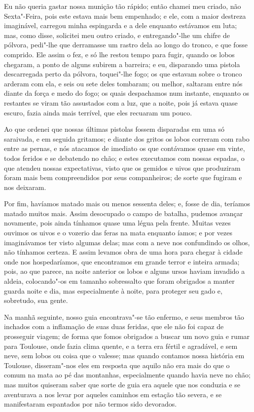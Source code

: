 Eu não queria gastar nossa munição tão rápido; então chamei meu criado,
não Sexta"-Feira, pois este estava mais bem empenhado; e ele, com a maior
destreza imaginável, carregou minha espingarda e a dele enquanto
estávamos em luta; mas, como disse, solicitei meu outro criado, e
entregando"-lhe um chifre de pólvora, pedi"-lhe que derramasse um rastro
dela ao longo do tronco, e que fosse comprido. Ele assim o fez, e só lhe
restou tempo para fugir, quando os lobos chegaram, a ponto de alguns
subirem a barreira; e eu, disparando uma pistola descarregada perto da
pólvora, toquei"-lhe fogo; os que estavam sobre o tronco arderam com ela,
e seis ou sete deles tombaram; ou melhor, saltaram entre nós diante da
força e medo do fogo; os quais despachamos num instante, enquanto os
restantes se viram tão assustados com a luz, que a noite, pois já estava
quase escuro, fazia ainda mais terrível, que eles recuaram um pouco.

Ao que ordenei que nossas últimas pistolas fossem disparadas em uma só
saraivada, e em seguida gritamos; e diante dos gritos os lobos correram
com rabo entre as pernas, e nós atacamos de imediato os que contávamos
quase em vinte, todos feridos e se debatendo no chão; e estes executamos
com nossas espadas, o que atendeu nossas expectativas, visto que os
gemidos e uivos que produziram foram mais bem compreendidos por seus
companheiros; de sorte que fugiram e nos deixaram.

Por fim, havíamos matado mais ou menos sessenta deles; e, fosse de dia,
teríamos matado muitos mais. Assim desocupado o campo de batalha,
pudemos avançar novamente, pois ainda tínhamos quase uma légua pela
frente. Muitas vezes ouvimos os uivos e o vozerio das feras na mata
enquanto íamos; e por vezes imaginávamos ter visto algumas delas; mas
com a neve nos confundindo os olhos, não tínhamos certeza. E assim
levamos obra de uma hora para chegar à cidade onde nos hospedaríamos,
que encontramos em grande terror e inteira armada; pois, ao que parece,
na noite anterior os lobos e alguns ursos haviam invadido a aldeia,
colocando"-os em tamanho sobressalto que foram obrigados a manter guarda
noite e dia, mas especialmente à noite, para proteger seu gado e,
sobretudo, sua gente.

Na manhã seguinte, nosso guia encontrava"-se tão enfermo, e seus membros
tão inchados com a inflamação de suas duas feridas, que ele não foi
capaz de prosseguir viagem; de forma que fomos obrigados a buscar um
novo guia e rumar para Toulouse, onde fazia clima quente, e a terra era
fértil e agradável, e sem neve, sem lobos ou coisa que o valesse; mas
quando contamos nossa história em Toulouse, disseram"-nos eles em
resposta que aquilo não era mais do que o comum na mata ao pé das
montanhas, especialmente quando havia neve no chão; mas muitos quiseram
saber que sorte de guia era aquele que nos conduzia e se aventurava a
nos levar por aqueles caminhos em estação tão severa, e se manifestaram
espantados por não termos sido devorados.

